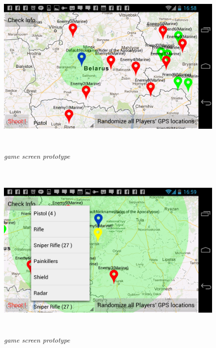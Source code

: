 \begin{figure}
\includegraphics[height=3.5in,width=6.23in]{./images/android_screenshots/ui_prototype/UI_prototype_3.png}  
\caption{\small \sl game screen prototype \label{fig:UIPrototype3}}
\end{figure}

\begin{figure}
\includegraphics[height=3.5in,width=6.23in]{./images/android_screenshots/ui_prototype/UI_prototype_4.png}  
\caption{\small \sl game screen prototype \label{fig:UIPrototype4}}
\end{figure}

